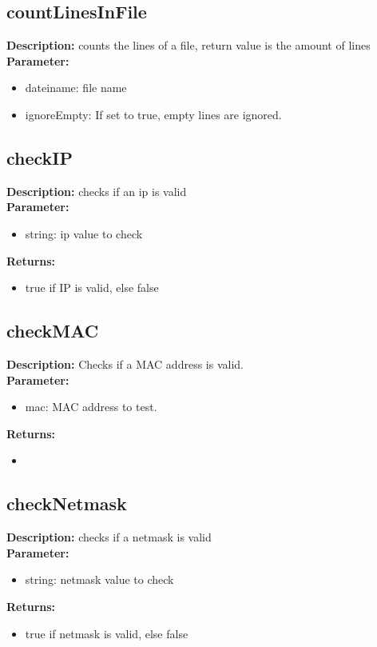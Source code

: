 \subsection{countLinesInFile}
\textbf{Description:} counts the lines of a file, return value is the amount of lines\\
\textbf{Parameter:}
\begin{itemize}
\item dateiname: file name
\item ignoreEmpty: If set to true, empty lines are ignored.
\end{itemize}

\subsection{checkIP}
\textbf{Description:} checks if an ip is valid\\
\textbf{Parameter:}
\begin{itemize}
\item string: ip value to check
\end{itemize}
\textbf{Returns:}
\begin{itemize}
\item true if IP is valid, else false
\end{itemize}

\subsection{checkMAC}
\textbf{Description:} Checks if a MAC address is valid.\\
\textbf{Parameter:}
\begin{itemize}
\item mac: MAC address to test.
\end{itemize}
\textbf{Returns:}
\begin{itemize}
\item 
\end{itemize}

\subsection{checkNetmask}
\textbf{Description:} checks if a netmask is valid\\
\textbf{Parameter:}
\begin{itemize}
\item string: netmask value to check
\end{itemize}
\textbf{Returns:}
\begin{itemize}
\item true if netmask is valid, else false
\end{itemize}

